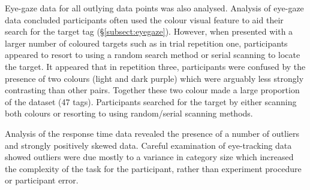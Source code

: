Eye-gaze data for all outlying data points was also analysed.  Analysis of eye-gaze data concluded participants often used the colour visual feature to aid their search for the target tag (\S\ref{subsect:eyegaze}). However, when presented with a larger number of coloured targets such as in trial repetition one, participants appeared to resort to using a random search method or serial scanning to locate the target. It appeared that in repetition three, participants were confused by the presence of two colours  (light and dark purple) which were arguably less strongly contrasting than other pairs. Together these two colour made a large proportion of the dataset (47 tags). Participants searched for the target by either scanning both colours or resorting to using random/serial scanning methods.

Analysis of the response time data revealed the presence of a number of outliers and strongly positively skewed data. Careful examination of eye-tracking data showed outliers were due mostly to a variance in category size which increased the complexity of the task for the participant, rather than experiment procedure or participant error. 





